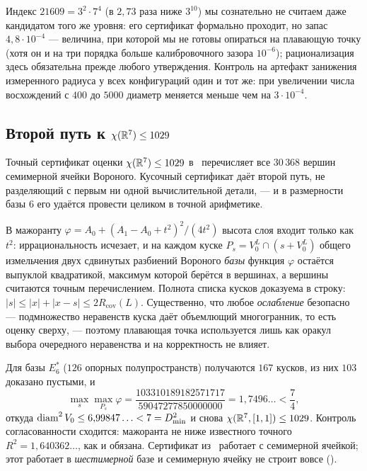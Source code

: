 Индекс $21609=3^2\cdot7^4$ (в $2{,}73$ раза ниже $3^{10}$) мы сознательно
не считаем даже кандидатом того же уровня: его сертификат формально проходит,
но запас $4{,}8\cdot10^{-4}$ --- величина, при которой мы не готовы опираться
на плавающую точку (хотя он и на три порядка больше калибровочного зазора
$10^{-6}$); рационализация здесь обязательна прежде любого утверждения.
Контроль на артефакт занижения измеренного радиуса у всех конфигураций один и
тот же: при увеличении числа восхождений с $400$ до $5000$ диаметр меняется
меньше чем на $3\cdot10^{-4}$.

\subsection{Второй путь к $\chi(\mathbb{R}^7)\le1029$}\label{ssec:r7second}

Точный сертификат оценки $\chi(\mathbb{R}^7)\le1029$ в~\cite{Bounds} перечисляет все
$30\,368$ вершин семимерной ячейки Вороного. Кусочный сертификат даёт второй
путь, не разделяющий с первым ни одной вычислительной детали, --- и в
размерности базы $6$ его удаётся провести целиком в точной арифметике.

\begin{remark}\label{rem:r7second}
В мажоранту $\varphi=A_0+(A_1-A_0+t^2)^2/(4t^2)$ высота слоя входит только как
$t^2$: иррациональность исчезает, и на каждом куске
$P_s=V_0^{L}\cap(s+V_0^{L})$ общего измельчения двух сдвинутых разбиений
Вороного \emph{базы} функция $\varphi$ остаётся выпуклой квадратикой, максимум
которой берётся в вершинах, а вершины считаются точным перечислением. Полнота
списка кусков доказуема в строку: $|s|\le|x|+|x-s|\le2R_{\mathrm{cov}}(L)$.
Существенно, что любое \emph{ослабление} безопасно --- подмножество неравенств
куска даёт объемлющий многогранник, то есть оценку сверху, --- поэтому
плавающая точка используется лишь как оракул выбора очередного неравенства и на
корректность не влияет.

Для базы $E_6^*$ ($126$ опорных полупространств) получаются $167$ кусков, из них
$103$ доказано пустыми, и
\[
\max_s\max_{P_s}\varphi=\frac{103310189182571717}{59047277850000000}
=1{,}7496\ldots<\frac74,
\]
откуда $\operatorname{diam}^2V_0\le6{,}99847\ldots<7=D_{\min}^2$ и снова
$\chi(\mathbb{R}^7,[1,1])\le1029$. Контроль согласованности сходится: мажоранта не ниже
известного точного $R^2=1{,}640362\ldots$, как и обязана. Сертификат
из~\cite{Bounds} работает с семимерной ячейкой; этот работает в
\emph{шестимерной} базе и семимерную ячейку не строит вовсе
().
\end{remark}
